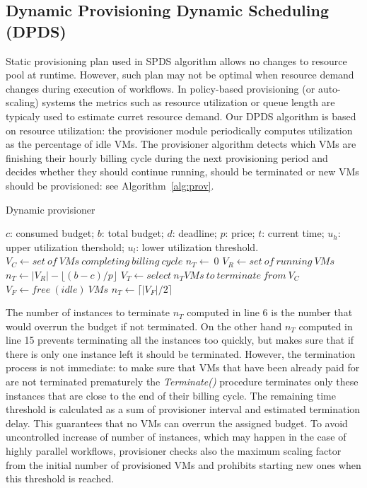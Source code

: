 \documentclass{sig-alternate}
\begin{document}
\subsection{Dynamic Provisioning Dynamic Scheduling (DPDS)}

Static provisioning plan used in SPDS algorithm allows no changes to resource
pool at runtime. However, such plan may not be optimal when resource demand
changes during execution of workflows. In policy-based provisioning
(or auto-scaling) systems the metrics such as resource
utilization or queue length are typicaly used to estimate curret resource
demand. Our DPDS algorithm is based on resource utilization: the provisioner
module periodically computes utilization as the percentage of idle VMs. The
provisioner algorithm detects which VMs are finishing their hourly billing cycle
during the next provisioning period and decides whether they should continue
running, should be terminated or new VMs should be provisioned: see
Algorithm~\ref{alg:prov}.

\begin{algorithm}
\caption{Dynamic provisioner}
\label{alg:prov}
\begin{algorithmic}[1]
\Require $c$: consumed budget; $b$: total budget; $d$: deadline; $p$: price;
$t$: current time; $u_h$: upper utilization thershold; $u_l$: lower utilization
threshold.
    \State $V_C\gets set\ of\ VMs\ completing\ billing\ cycle$
    \State $n_T\gets\ 0$  
    	\State $V_R\gets set\ of\ running\ VMs$
    	\State $n_T\gets |V_R| - \lfloor(b-c)/p\rfloor$ 
    	\State $V_T\gets select\ n_T VMs\ to\ terminate\ from\ V_C$
    	\State {}
    \Else 
    		\State {}
    	\EndIf
    		\State $V_F\gets free\ (idle)\ VMs$
    		\State $n_T\gets \lceil|V_F|/2\rceil$ 
    		\State {}
    	\EndIf 
    \EndIf
\EndProcedure
\end{algorithmic} 
\end{algorithm}

The number of instances to terminate $n_T$ computed in line 6 is the number that
would overrun the budget if not terminated. On the other hand $n_T$ computed in
line 15 prevents terminating all the instances too quickly, but makes sure that
if there is only one instance left it should be terminated. However, the
termination process is not immediate: to make sure that VMs that have been
already paid for are not terminated prematurely the {\em Terminate()} procedure
terminates only these instances that are close to the end of their billing
cycle. The remaining time threshold is calculated as a sum of provisioner
interval and estimated termination delay. This guarantees that no VMs can
overrun the assigned budget. To avoid uncontrolled increase of number of
instances, which may happen in the case of highly parallel workflows,
provisioner checks also the maximum scaling factor from the initial number of
provisioned VMs and prohibits starting new ones when this threshold is reached.
\end{document}
